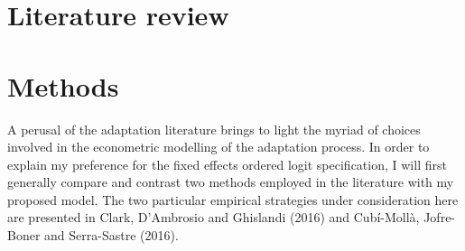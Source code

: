 \documentclass[12pt]{article}
\begin{document}

\FloatBarrier


\section{Literature review}



\section{Methods}

A perusal of the adaptation literature brings to light the myriad of choices involved in the econometric modelling of the adaptation process. In order to explain my preference for the fixed effects ordered logit specification, I will first generally compare and contrast two methods employed in the literature with my proposed model. The two particular empirical strategies under consideration here are presented in Clark, D'Ambrosio and Ghislandi (2016) and Cub\'i-Moll\`a, Jofre-Boner and Serra-Sastre (2016). 
\end{document}
